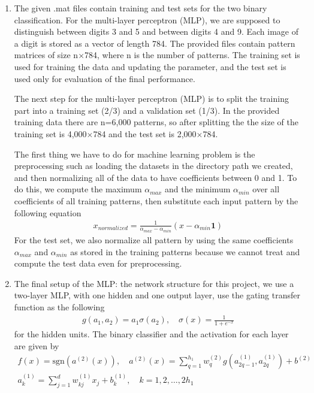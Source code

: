 \begin{enumerate}[(1)]
\item The given .mat files contain training and test sets for the two binary classification. For the multi-layer perceptron (MLP), we are supposed to distinguish between digits 3 and 5 and between digits 4 and 9. Each image of a digit is stored as a vector of length 784. The provided files contain pattern matrices of size n$\times$784, where n is the number of patterns. The training set is used for training the data and updating the parameter, and the test set is used only for evaluation of the final performance.

	The next step for the multi-layer perceptron (MLP) is to split the training part into a training set (2/3) and a validation set (1/3). In the provided training data there are n=6,000 patterns, so after splitting the the size of the training set is 4,000$\times$784 and the test set is 2,000$\times$784.

	The first thing we have to do for machine learning problem is the preprocessing such as loading the datasets in the directory path we created, and then normalizing all of the data to have coefficients between 0 and 1. To do this, we compute the maximum $\alpha_{max}$ and the minimum $\alpha_{min}$ over all coefficients of all training patterns, then substitute each input pattern by the following equation
\begin{align}
x_{normalized}=\frac{1}{\alpha_{max} - \alpha_{min}}(x-\alpha_{min}\mathbf{1})
\end{align}
For the test set, we also normalize all pattern by using the same coefficients $\alpha_{max}$ and $\alpha_{min}$ as stored in the training patterns because we cannot treat and compute the test data even for preprocessing.

\item The final setup of the MLP: the network structure for this project, we use a two-layer MLP, with one hidden and one output layer, use the gating transfer function as the following
\begin{align}
g(a_1,a_2)=a_1 \sigma(a_2),\quad\sigma(x) = \frac{1}{1+e^{-x}}
\end{align}
for the hidden units. The binary classifier and the activation for each layer are given by
\begin{align}
f(x)=\text{sgn}(a^{(2)}(x)),\quad a^{(2)}(x) = \sum_{q=1}^{h_1} w_{q}^{(2)} g(a_{2q-1}^{(1)}, a_{2q}^{(1)})+b^{(2)}\\
a_{k}^{(1)} = \sum_{j=1}^{d} w_{kj}^{(1)}x_{j}+b_{k}^{(1)},\quad k=1,2,\dots,2h_{1}
\end{align}


\end{enumerate}
